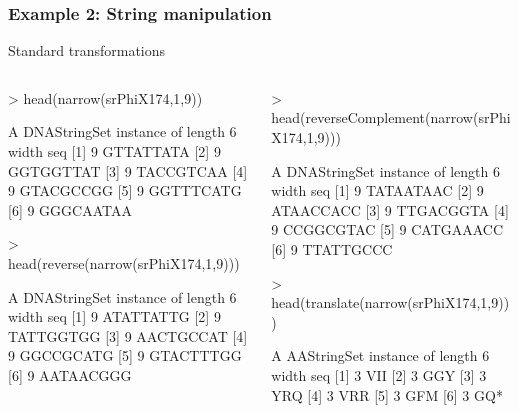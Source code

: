 \documentclass{beamer}
\begin{document}

\begin{frame}[fragile]
\frametitle{Example 2: String manipulation}
  \bit
      \item Standard transformations
        \begin{columns}
          \begin{column}[t]{0.45\textwidth}%
            \begin{uncoverenv}
\begin{Schunk}
\begin{Sinput}
> head(narrow(srPhiX174,1,9))
\end{Sinput}
\begin{Soutput}
  A DNAStringSet instance of length 6
    width seq
[1]     9 GTTATTATA
[2]     9 GGTGGTTAT
[3]     9 TACCGTCAA
[4]     9 GTACGCCGG
[5]     9 GGTTTCATG
[6]     9 GGGCAATAA
\end{Soutput}
\begin{Sinput}
> head(reverse(narrow(srPhiX174,1,9)))
\end{Sinput}
\begin{Soutput}
  A DNAStringSet instance of length 6
    width seq
[1]     9 ATATTATTG
[2]     9 TATTGGTGG
[3]     9 AACTGCCAT
[4]     9 GGCCGCATG
[5]     9 GTACTTTGG
[6]     9 AATAACGGG
\end{Soutput}
\end{Schunk}
            \end{uncoverenv} 
          \end{column}
      
          \begin{column}[t]{0.50\textwidth}%
            \begin{uncoverenv}
\begin{Schunk}
\begin{Sinput}
> head(reverseComplement(narrow(srPhiX174,1,9)))
\end{Sinput}
\begin{Soutput}
  A DNAStringSet instance of length 6
    width seq
[1]     9 TATAATAAC
[2]     9 ATAACCACC
[3]     9 TTGACGGTA
[4]     9 CCGGCGTAC
[5]     9 CATGAAACC
[6]     9 TTATTGCCC
\end{Soutput}
\begin{Sinput}
> head(translate(narrow(srPhiX174,1,9)))
\end{Sinput}
\begin{Soutput}
  A AAStringSet instance of length 6
    width seq
[1]     3 VII
[2]     3 GGY
[3]     3 YRQ
[4]     3 VRR
[5]     3 GFM
[6]     3 GQ*
\end{Soutput}
\end{Schunk}
            \end{uncoverenv} 
          \end{column}
        \end{columns} 
  \eit
\end{frame}
\end{document}
